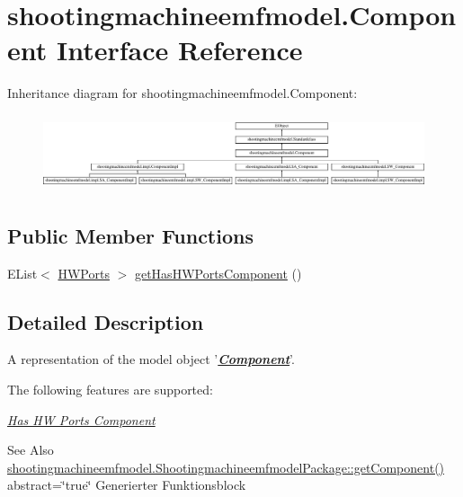 \hypertarget{interfaceshootingmachineemfmodel_1_1_component}{\section{shootingmachineemfmodel.\-Component Interface Reference}
\label{interfaceshootingmachineemfmodel_1_1_component}
}
Inheritance diagram for shootingmachineemfmodel.\-Component\-:\begin{figure}[H]
\begin{center}
\leavevmode
\includegraphics[height=2.272727cm]{interfaceshootingmachineemfmodel_1_1_component}
\end{center}
\end{figure}
\subsection*{Public Member Functions}
\begin{DoxyCompactItemize}
\item 
E\-List$<$ \hyperlink{interfaceshootingmachineemfmodel_1_1_h_w_ports}{H\-W\-Ports} $>$ \hyperlink{interfaceshootingmachineemfmodel_1_1_component_a6f2301c79037a6e17d76b291122284bf}{get\-Has\-H\-W\-Ports\-Component} ()
\end{DoxyCompactItemize}


\subsection{Detailed Description}
A representation of the model object '{\itshape {\bfseries \hyperlink{interfaceshootingmachineemfmodel_1_1_component}{Component}}}'.

The following features are supported\-: 
\begin{DoxyItemize}
\item \hyperlink{interfaceshootingmachineemfmodel_1_1_component_a6f2301c79037a6e17d76b291122284bf}{{\itshape Has H\-W Ports Component}} 
\end{DoxyItemize}

\begin{DoxySeeAlso}{See Also}
\hyperlink{interfaceshootingmachineemfmodel_1_1_shootingmachineemfmodel_package_a6d4775830611ba638cc97c20d99b2a5a}{shootingmachineemfmodel.\-Shootingmachineemfmodel\-Package\-::get\-Component()}  abstract=\char`\"{}true\char`\"{} Generierter Funktionsblock 
\end{DoxySeeAlso}


